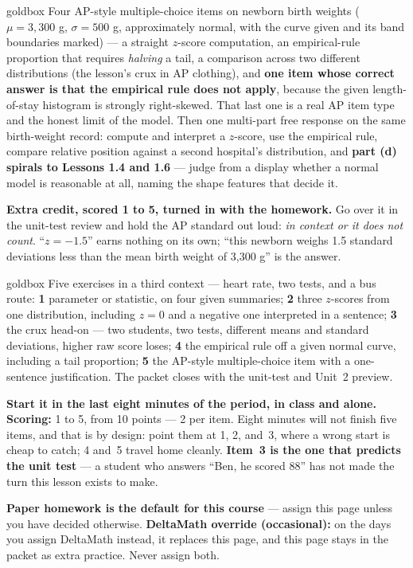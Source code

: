 \documentclass[10pt]{article}
\begin{document}
\boxguard
\begin{skillbox}{goldbox}
Four AP-style multiple-choice items on newborn birth weights ($\mu = 3{,}300$ g,
$\sigma = 500$ g, approximately normal, with the curve given and its band boundaries marked) ---
a straight $z$-score computation, an empirical-rule proportion that requires \emph{halving} a
tail, a comparison across two different distributions (the lesson's crux in AP clothing), and
\textbf{one item whose correct answer is that the empirical rule does not apply}, because the
given length-of-stay histogram is strongly right-skewed. That last one is a real AP item type and
the honest limit of the model. Then one multi-part free response on the same birth-weight record:
compute and interpret a $z$-score, use the empirical rule, compare relative position against a
second hospital's distribution, and \textbf{part (d) spirals to Lessons 1.4 and 1.6} --- judge
from a display whether a normal model is reasonable at all, naming the shape features that decide
it.

\textbf{Extra credit, scored 1 to 5, turned in with the homework.} Go over it in
the unit-test review and hold the AP standard out loud: \emph{in context or it does not count}.
``$z = -1.5$'' earns nothing on its own; ``this newborn weighs 1.5 standard deviations less than
the mean birth weight of 3,300 g'' is the answer.
\end{skillbox}

\boxguard
\begin{skillbox}{goldbox}
Five exercises in a third context --- heart rate, two tests, and a bus route: \textbf{1}
parameter or statistic, on four given summaries; \textbf{2} three $z$-scores from one
distribution, including $z = 0$ and a negative one interpreted in a sentence; \textbf{3} the crux
head-on --- two students, two tests, different means and standard deviations, higher raw score
loses; \textbf{4} the empirical rule off a given normal curve, including a tail proportion;
\textbf{5} the AP-style multiple-choice item with a one-sentence justification. The packet closes
with the unit-test and Unit~2 preview.

\textbf{Start it in the last eight minutes of the period, in class and alone.} \textbf{Scoring:}
1 to 5, from 10 points --- 2 per item. Eight minutes will not finish five items, and that is by design: point
them at 1, 2, and~3, where a wrong start is cheap to catch; 4 and~5 travel home cleanly.
\textbf{Item~3 is the one that predicts the unit test} --- a student who answers ``Ben, he scored
88'' has not made the turn this lesson exists to make.

\textbf{Paper homework is the default for this course} --- assign this page unless you have
decided otherwise. \textbf{DeltaMath override (occasional):} on the days you assign DeltaMath
instead, it replaces this page, and this page
stays in the packet as extra practice. Never assign both.
\end{skillbox}
\end{document}

